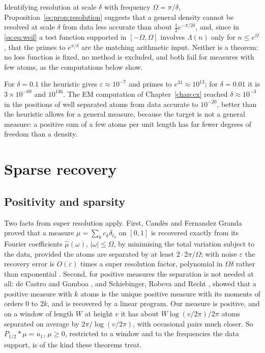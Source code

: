 \begin{remark}[heuristic]\label{es:rem:resolution}
Identifying resolution at scale $\delta$ with frequency $\Omega=\pi/\delta$, Proposition~\ref{es:prop:resolution} suggests that a general density cannot be resolved at scale $\delta$ from data less accurate than about $\tfrac12e^{-\pi/2\delta}$, and, since in \eqref{es:eq:weil} a test function supported in $[-\Omega,\Omega]$ involves $\Lambda(n)$ only for $n\le e^\Omega$, that the primes to $e^{\pi/\delta}$ are the matching arithmetic input. Neither is a theorem: no loss function is fixed, no method is excluded, and both fail for measures with few atoms, as the computations below show.
\end{remark}

For $\delta=0.1$ the heuristic gives $\varepsilon\approx10^{-7}$ and primes to $e^{31}\approx10^{13}$; for $\delta=0.01$ it is $3\times10^{-69}$ and $10^{136}$. The EM computation of Chapter~\ref{chap:cx} reached $\delta\approx10^{-3}$ in the positions of well separated atoms from data accurate to $10^{-20}$, better than the heuristic allows for a general measure, because the target is not a general measure: a positive sum of a few atoms per unit length has far fewer degrees of freedom than a density.

\section{Sparse recovery}\label{es:sec:sparse}

\subsection{Positivity and sparsity}

Two facts from super resolution apply. First, Cand\`es and Fernandez Granda \cite{CandesFG14} proved that a measure $\mu=\sum_kc_k\delta_{t_k}$ on $[0,1]$ is recovered exactly from its Fourier coefficients $\widehat\mu(\omega)$, $|\omega|\le\Omega$, by minimising the total variation subject to the data, provided the atoms are separated by at least $2\cdot2\pi/\Omega$; with noise $\varepsilon$ the recovery error is $O(\varepsilon)$ times a super resolution factor, polynomial in $\Omega\delta$ rather than exponential \cite{CandesFG13}. Second, for positive measures the separation is not needed at all: de Castro and Gamboa \cite{deCastroGamboa12}, and Schiebinger, Robeva and Recht \cite{SchiebingerRR18}, showed that a positive measure with $k$ atoms is the unique positive measure with its moments of orders $0$ to $2k$, and is recovered by a linear program. Our measure is positive, and on a window of length $W$ at height $v$ it has about $W\log(v/2\pi)/2\pi$ atoms separated on average by $2\pi/\log(v/2\pi)$, with occasional pairs much closer. So $P_{1/2}*\mu=u_1$, $\mu\ge0$, restricted to a window and to the frequencies the data support, is of the kind these theorems treat.

